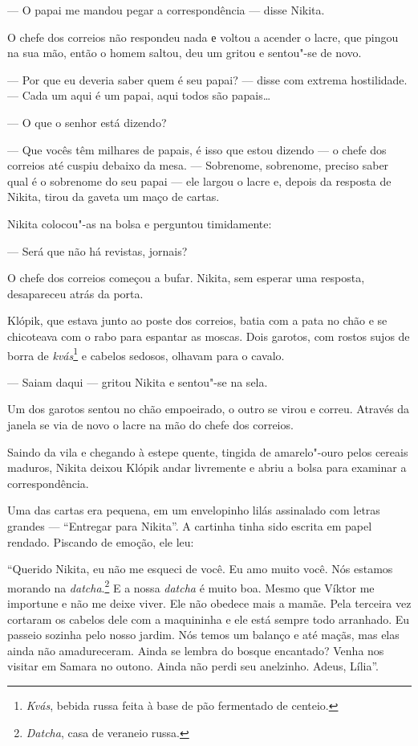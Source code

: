 --- O papai me mandou pegar a correspondência --- disse Nikita.

O chefe dos correios não respondeu nada е voltou a acender o lacre, que
pingou na sua mão, então o homem saltou, deu um gritou e sentou"-se de
novo.

--- Por que eu deveria saber quem é seu papai? --- disse com extrema
hostilidade. --- Cada um aqui é um papai, aqui todos são papais\ldots{}

--- O que o senhor está dizendo?

--- Que vocês têm milhares de papais, é isso que estou dizendo --- o
chefe dos correios até cuspiu debaixo da mesa. --- Sobrenome, sobrenome,
preciso saber qual é o sobrenome do seu papai --- ele largou o lacre
e, depois da resposta de Nikita, tirou da gaveta um maço de cartas.

Nikita colocou"-as na bolsa e perguntou timidamente:

--- Será que não há revistas, jornais?

O chefe dos correios começou a bufar. Nikita, sem esperar uma resposta,
desapareceu atrás da porta.

Klópik, que estava junto ao poste dos correios, batia com a pata no chão
e se chicoteava com o rabo para espantar as moscas. Dois garotos, com
rostos sujos de borra de \emph{kvás}\footnote{\emph{Kvás}, bebida russa feita à
  base de pão fermentado de centeio.} e cabelos sedosos, olhavam para o
cavalo.

--- Saiam daqui --- gritou Nikita e sentou"-se na sela.

Um dos garotos sentou no chão empoeirado, o outro se virou e correu.
Através da janela se via de novo o lacre na mão do chefe dos correios.

Saindo da vila e chegando à estepe quente, tingida de amarelo"-ouro pelos
cereais maduros, Nikita deixou Klópik andar livremente e abriu a bolsa
para examinar a correspondência.

Uma das cartas era pequena, em um envelopinho lilás assinalado com
letras grandes --- ``Entregar para Nikita''. A cartinha tinha sido
escrita em papel rendado. Piscando de emoção, ele leu:

``Querido Nikita, eu não me esqueci de você. Eu amo muito você. Nós
estamos morando na \emph{datcha}.\footnote{\emph{Datcha}, casa de veraneio russa.} E a nossa \emph{datcha} é muito boa.
Mesmo que Víktor me importune e não me deixe viver. Ele não obedece mais
a mamãe. Pela terceira vez cortaram os cabelos dele com a maquininha e
ele está sempre todo arranhado. Eu passeio sozinha pelo nosso jardim.
Nós temos um balanço e até maçãs, mas elas ainda não amadureceram. Ainda
se lembra do bosque encantado? Venha nos visitar em Samara no outono.
Ainda não perdi seu anelzinho. Adeus, Lília''.

